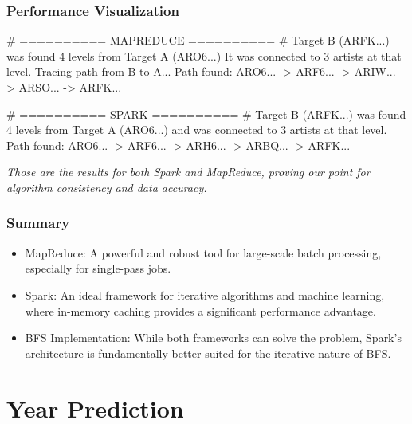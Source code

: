 \documentclass{beamer}
\begin{document}
\begin{frame}[fragile]
    \frametitle{Performance Visualization}
    
    \begin{mycodetiny}
        # ========== MAPREDUCE ========== #
        Target B (ARFK...) was found 4 levels from Target A (ARO6...)
        It was connected to 3 artists at that level.
        Tracing path from B to A...
        Path found:
        ARO6... -> ARF6... -> ARIW... -> ARSO... -> ARFK...
        
        # ========== SPARK ========== #
        Target B (ARFK...) was found 4 levels from Target A (ARO6...) and was connected to 3 artists at that level.
        Path found:
        ARO6... -> ARF6... -> ARH6... -> ARBQ... -> ARFK...
    \end{mycodetiny}

    \centering
    \textit{Those are the results for both Spark and MapReduce, proving our point for algorithm consistency and data accuracy.}
\end{frame}

\begin{frame}[fragile]
    \frametitle{Summary}
    
    \begin{itemize}
        \item MapReduce: A powerful and robust tool for large-scale batch processing, especially for single-pass jobs.
        \item Spark: An ideal framework for iterative algorithms and machine learning, where in-memory caching provides a significant performance advantage.
        \item BFS Implementation: While both frameworks can solve the problem, Spark's architecture is fundamentally better suited for the iterative nature of BFS.
    \end{itemize}
\end{frame}

\section{Year Prediction}
\end{document}
